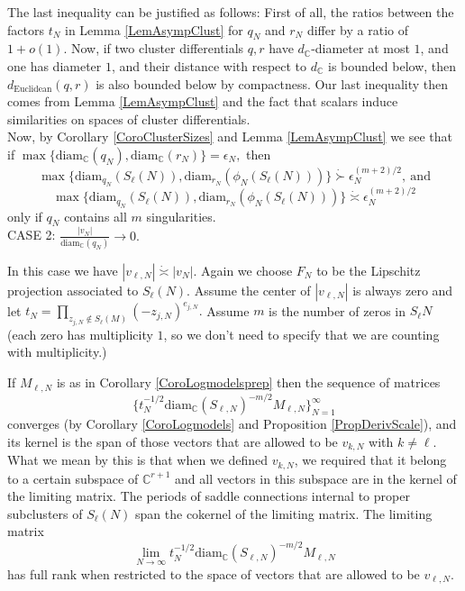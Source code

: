 \documentclass[12pt]{article}
\newcommand{\cc}{\mathbb{C}}
\newcommand{\diam}{\mathrm{diam}}
\begin{document}
\noindent The last inequality can be justified as follows: First of all, the ratios between the factors $t_N$ in Lemma \ref{LemAsympClust} for $q_N$ and $r_N$ differ by a ratio of $1 + o(1)$. Now, if two cluster differentials $q,r$ have $d_\cc$-diameter at most $1$, and one has diameter $1$, and their distance with respect to $d_\cc$ is bounded below, then $d_\mathrm{Euclidean}(q,r)$ is also bounded below by compactness. Our last inequality then comes from Lemma \ref{LemAsympClust} and the fact that scalars induce similarities on spaces of cluster differentials.\\

\noindent Now, by Corollary \ref{CoroClusterSizes} and Lemma \ref{LemAsympClust} we see that if $\max\{\diam_{\cc}(q_N),\diam_\cc(r_N)\} = \epsilon_N,$ then $$\max\{\diam_{q_N}(S_\ell(N)),\diam_{r_N}(\phi_N(S_\ell(N)))\} \dot{\succ} \epsilon_N^{(m+2)/2}, ~ \mathrm{and}$$ $$\max\{\diam_{q_N}(S_\ell(N)),\diam_{r_N}(\phi_N(S_\ell(N)))\} \dot{\asymp} \epsilon_N^{(m+2)/2}$$ only if $q_N$ contains all $m$ singularities.\\

\noindent CASE 2: $\frac{|v_N|}{\diam_\cc(q_N)} \to 0.$

\noindent In this case we have $|v_{\ell,N}| \dot{\asymp} |v_N|.$ Again we choose $F_N$ to be the Lipschitz projection associated to $S_\ell(N)$. Assume the center of $|v_{\ell,N}|$ is always zero and let $t_N = \prod\limits_{z_{j,N} \notin S_\ell(M)} (-z_{j,N})^{e_{j,N}}.$ Assume $m$ is the number of zeros in $S_\ell{N}$ (each zero has multiplicity $1$, so we don't need to specify that we are counting with multiplicity.)

\noindent If $M_{\ell,N}$ is as in Corollary \ref{CoroLogmodelsprep} then the sequence of matrices $$\{t_N^{-1/2}\diam_\cc(S_{\ell,N})^{-m/2} M_{\ell,N}\}_{N = 1}^\infty$$ converges (by Corollary \ref{CoroLogmodels} and Proposition \ref{PropDerivScale}), and its kernel is the span of those vectors that are allowed to be $v_{k,N}$ with $k \neq \ell$. What we mean by this is that when we defined $v_{k,N}$, we required that it belong to a certain subspace of $\cc^{r+1}$ and all vectors in this subspace are in the kernel of the limiting matrix. The periods of saddle connections internal to proper subclusters of $S_\ell(N)$ span the cokernel of the limiting matrix. The limiting matrix $$\lim\limits_{N \to \infty} t_N^{-1/2}\diam_\cc(S_{\ell,N})^{-m/2} M_{\ell,N}$$ has full rank when restricted to the space of vectors that are allowed to be $v_{\ell,N}$.\\
\end{document}
